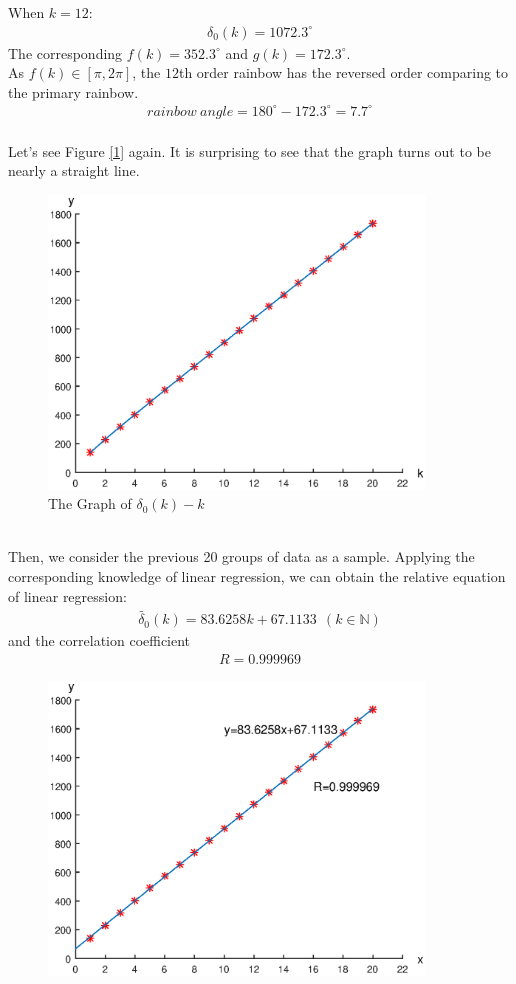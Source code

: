 \documentclass{article}
\begin{document}
\begin{spacing}{1.5}
When $k=12$:\begin{align*} \delta_0(k)=1072.3^{\circ}\end{align*}
The corresponding $f(k)=352.3^{\circ}$ and $g(k)=172.3^{\circ}$.\\
As $f(k)\in[\pi,2\pi]$, the $12$th order rainbow has the reversed order comparing to the primary rainbow.\\
\begin{align*} rainbow\ angle=180^{\circ}-172.3^{\circ}=7.7^{\circ}\end{align*}
\\
Let's see Figure \ref{1} again. It is surprising to see that the graph turns out to be nearly a straight line.\\
\begin{figure}[!htb]
\centering
\includegraphics[width=10cm]{Figure4.eps}
\caption{The Graph of $\delta_0(k)-k$}
\end{figure}
\\
Then, we consider the previous 20 groups of data as a sample. Applying the corresponding knowledge of linear regression, we can obtain the relative equation of linear regression: \begin{align*}\tilde{\delta_0}(k)=83.6258k + 67.1133 \ \ (k\in \mathbb{N})\end{align*}
and the correlation coefficient \begin{align*}
R=0.999969
\end{align*}
\begin{figure}[!htb]
\centering
\includegraphics[width=10cm]{Figure5.eps}

\end{figure}
\end{spacing}
\end{document}
